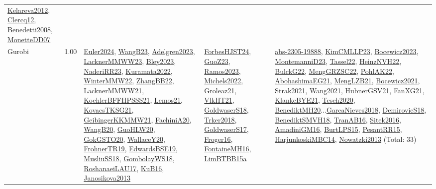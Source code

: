 {\begin{longtable}{p{3cm}r>{\raggedright\arraybackslash}p{6cm}>{\raggedright\arraybackslash}p{6cm}>{\raggedright\arraybackslash}p{8cm}}
\hyperref[detail:Kelareva2012]{Kelareva2012}, \hyperref[detail:Clercq12]{Clercq12}, \hyperref[detail:Benedetti2008]{Benedetti2008}, \hyperref[detail:MonetteDD07]{MonetteDD07}\\
\index{Gurobi}\index{CPSystems!Gurobi}Gurobi &  1.00 & \hyperref[detail:Euler2024]{Euler2024}, \hyperref[detail:WangB23]{WangB23}, \hyperref[detail:Adelgren2023]{Adelgren2023}, \hyperref[detail:LacknerMMWW23]{LacknerMMWW23}, \hyperref[detail:Bley2023]{Bley2023}, \hyperref[detail:NaderiRR23]{NaderiRR23}, \hyperref[detail:Kuramata2022]{Kuramata2022}, \hyperref[detail:WinterMMW22]{WinterMMW22}, \hyperref[detail:ZhangBB22]{ZhangBB22}, \hyperref[detail:LacknerMMWW21]{LacknerMMWW21}, \hyperref[detail:KoehlerBFFHPSSS21]{KoehlerBFFHPSSS21}, \hyperref[detail:Lemos21]{Lemos21}, \hyperref[detail:KovacsTKSG21]{KovacsTKSG21}, \hyperref[detail:GeibingerKKMMW21]{GeibingerKKMMW21}, \hyperref[detail:FachiniA20]{FachiniA20}, \hyperref[detail:WangB20]{WangB20}, \hyperref[detail:GuoHLW20]{GuoHLW20}, \hyperref[detail:GokGSTO20]{GokGSTO20}, \hyperref[detail:WallaceY20]{WallaceY20}, \hyperref[detail:FrohnerTR19]{FrohnerTR19}, \hyperref[detail:EdwardsBSE19]{EdwardsBSE19}, \hyperref[detail:MusliuSS18]{MusliuSS18}, \hyperref[detail:GombolayWS18]{GombolayWS18}, \hyperref[detail:RoshanaeiLAU17]{RoshanaeiLAU17}, \hyperref[detail:KuB16]{KuB16}, \hyperref[detail:Janosikova2013]{Janosikova2013} & \hyperref[detail:ForbesHJST24]{ForbesHJST24}, \hyperref[detail:GuoZ23]{GuoZ23}, \hyperref[detail:Ramos2023]{Ramos2023}, \hyperref[detail:Michels2022]{Michels2022}, \hyperref[detail:Groleaz21]{Groleaz21}, \hyperref[detail:VlkHT21]{VlkHT21}, \hyperref[detail:GoldwaserS18]{GoldwaserS18}, \hyperref[detail:Trker2018]{Trker2018}, \hyperref[detail:GoldwaserS17]{GoldwaserS17}, \hyperref[detail:Froger16]{Froger16}, \hyperref[detail:FontaineMH16]{FontaineMH16}, \hyperref[detail:LimBTBB15a]{LimBTBB15a} & \hyperref[detail:abs-2305-19888]{abs-2305-19888}, \hyperref[detail:KimCMLLP23]{KimCMLLP23}, \hyperref[detail:Bocewicz2023]{Bocewicz2023}, \hyperref[detail:MontemanniD23]{MontemanniD23}, \hyperref[detail:Tassel22]{Tassel22}, \hyperref[detail:HeinzNVH22]{HeinzNVH22}, \hyperref[detail:BulckG22]{BulckG22}, \hyperref[detail:MengGRZSC22]{MengGRZSC22}, \hyperref[detail:PohlAK22]{PohlAK22}, \hyperref[detail:AbohashimaEG21]{AbohashimaEG21}, \hyperref[detail:MengLZB21]{MengLZB21}, \hyperref[detail:Bocewicz2021]{Bocewicz2021}, \hyperref[detail:Strak2021]{Strak2021}, \hyperref[detail:Wang2021]{Wang2021}, \hyperref[detail:HubnerGSV21]{HubnerGSV21}, \hyperref[detail:FanXG21]{FanXG21}, \hyperref[detail:KlankeBYE21]{KlankeBYE21}, \hyperref[detail:Tesch2020]{Tesch2020}, \hyperref[detail:BenediktMH20]{BenediktMH20}...\hyperref[detail:GarcaNieves2018]{GarcaNieves2018}, \hyperref[detail:DemirovicS18]{DemirovicS18}, \hyperref[detail:BenediktSMVH18]{BenediktSMVH18}, \hyperref[detail:TranAB16]{TranAB16}, \hyperref[detail:Sitek2016]{Sitek2016}, \hyperref[detail:AmadiniGM16]{AmadiniGM16}, \hyperref[detail:BurtLPS15]{BurtLPS15}, \hyperref[detail:PesantRR15]{PesantRR15}, \hyperref[detail:HarjunkoskiMBC14]{HarjunkoskiMBC14}, \hyperref[detail:Nowatzki2013]{Nowatzki2013} (Total: 33)\\

\end{longtable}}
